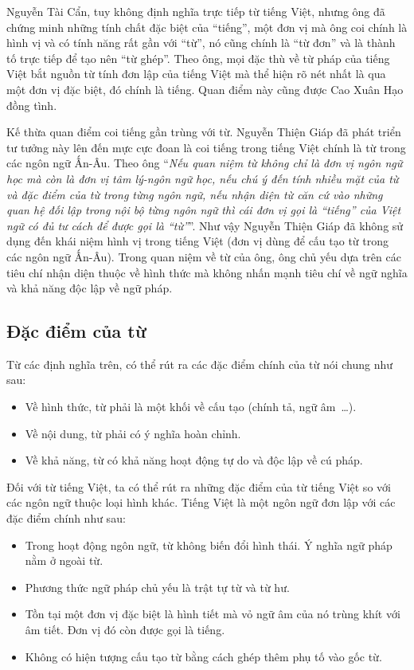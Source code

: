 \documentclass[a4paper,oneside,14pt]{extbook} %
\begin{document}
Nguyễn Tài Cẩn, tuy không định nghĩa trực tiếp từ tiếng Việt, nhưng
ông đã chứng minh những tính chất đặc biệt của ``tiếng'', một đơn vị
mà ông coi chính là hình vị và có tính năng rất gần với ``từ'', nó
cũng chính là ``từ đơn'' và là thành tố trực tiếp để tạo nên ``từ
ghép''. Theo ông, mọi đặc thù về từ pháp của tiếng Việt bắt nguồn từ
tính đơn lập của tiếng Việt mà thể hiện rõ nét nhất là qua một đơn vị
đặc biệt, đó chính là tiếng. Quan điểm này cũng được Cao Xuân Hạo đồng
tình. 

Kế thừa quan điểm coi tiếng gần trùng với từ. Nguyễn Thiện Giáp đã
phát triển tư tưởng này lên đến mực cực đoan là coi tiếng trong tiếng
Việt chính là từ trong các ngôn ngữ Ấn-Âu. Theo ông ``\textit{Nếu quan
  niệm từ không chỉ là đơn vị ngôn ngữ học mà còn là đơn vị tâm
  lý-ngôn ngữ học, nếu chú ý đến tính nhiều mặt của từ và đặc điểm của
  từ trong từng ngôn ngữ, nếu nhận diện từ căn cứ vào những quan hệ
  đối lập trong nội bộ từng ngôn ngữ thì cái đơn vị gọi là ``tiếng''
  của Việt ngữ có đủ tư cách để được gọi là ``từ''}''. Như vậy Nguyễn
Thiện Giáp đã không sử dụng đến khái niệm hình vị trong tiếng Việt
(đơn vị dùng để cấu tạo từ trong các ngôn ngữ Ấn-Âu). Trong quan niệm
về từ của ông, ông chủ yếu dựa trên các tiêu chí nhận diện thuộc về
hình thức mà không nhấn mạnh tiêu chí về ngữ nghĩa và khả năng độc lập
về ngữ pháp.

\subsection{Đặc điểm của từ}

Từ các định nghĩa trên, có thể rút ra các đặc điểm chính của từ nói
chung như sau:
\begin{itemize}
\item Về hình thức, từ phải là một khối về cấu tạo (chính tả, ngữ
  âm~\ldots{}).
\item Về nội dung, từ phải có ý nghĩa hoàn chỉnh.
\item Về khả năng, từ có khả năng hoạt động tự do và độc lập về cú
  pháp.
\end{itemize}

Đối với từ tiếng Việt, ta có thể rút ra những đặc điểm của từ tiếng
Việt so với các ngôn ngữ thuộc loại hình khác.
Tiếng Việt là một ngôn ngữ đơn lập với các đặc điểm chính như sau:
\begin{itemize}
\item Trong hoạt động ngôn ngữ, từ không biến đổi hình thái. Ý nghĩa
  ngữ pháp nằm ở ngoài từ. 
\item Phương thức ngữ pháp chủ yếu là trật tự từ và từ hư.
\item Tồn tại một đơn vị đặc biệt là hình tiết mà vỏ ngữ âm của nó
  trùng khít với âm tiết. Đơn vị đó còn được gọi là tiếng.
\item Không có hiện tượng cấu tạo từ bằng cách ghép thêm phụ tố vào
  gốc từ.
\end{itemize}
\end{document}
